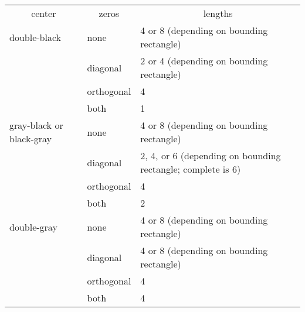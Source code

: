 

\begin{center}
\begin{tabular}{ |p{6em}|p{5em}|p{}| } 
\multicolumn{1}{c}{center} & \multicolumn{1}{c}{zeros} & \multicolumn{1}{c}{lengths}\\
 double-black                 & none       & 4 or 8 (depending on bounding rectangle) \\ 
                              & diagonal   & 2 or 4 (depending on bounding rectangle) \\ 
                              & orthogonal & 4  \\ 
                              & both       & 1  \\
\hline
gray-black or black-gray     & none       & 4 or 8 (depending on bounding rectangle)  \\ 
                              & diagonal   & 2, 4, or 6 (depending on bounding rectangle; complete is 6) \\ 
                              & orthogonal & 4 \\ 
                              & both       & 2  \\
\hline 
double-gray                  & none       & 4 or 8 (depending on bounding rectangle) \\ 
                              & diagonal   & 4 or 8 (depending on bounding rectangle) \\ 
                              & orthogonal & 4  \\ 
                              & both       & 4  \\ 

\end{tabular}
\end{center}

